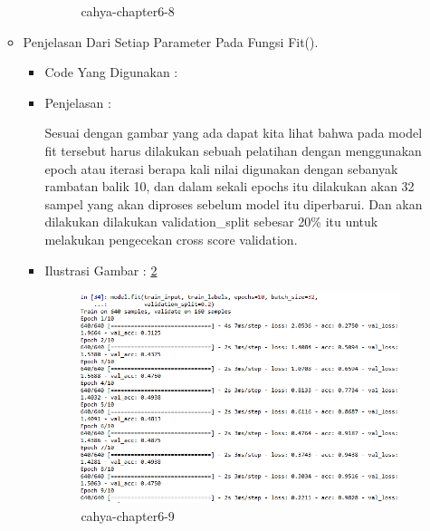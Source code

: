 \begin{enumerate}
\begin{itemize}
\begin{itemize}
\begin{figure}[!hbtp]
\caption{cahya-chapter6-8}
\label{cahya-chapter6-8}
\end{figure}
\par
\end{itemize}
\par
\par
\par
\par
\par
\par
\item Penjelasan Dari Setiap Parameter Pada Fungsi Fit().
\begin{itemize}
\item Code Yang Digunakan :
\par

\par
\item Penjelasan :
\par Sesuai dengan gambar yang ada dapat kita lihat bahwa pada model fit tersebut harus dilakukan sebuah pelatihan dengan menggunakan epoch atau iterasi berapa kali nilai digunakan dengan sebanyak rambatan balik 10, dan dalam sekali epochs itu dilakukan akan 32 sampel yang akan diproses sebelum model itu diperbarui. Dan akan dilakukan dilakukan validation\_split sebesar 20\% itu untuk melakukan pengecekan cross score validation.
\par
\par
\item Ilustrasi Gambar : \ref{cahya-chapter6-9}
\par
\begin{figure}[!hbtp]
\centering
\includegraphics[scale=0.2]{figures/cahya-cahpter-6-9.png}
\caption{cahya-chapter6-9}
\label{cahya-chapter6-9}

\end{figure}
\end{itemize}
\end{itemize}
\end{enumerate}
